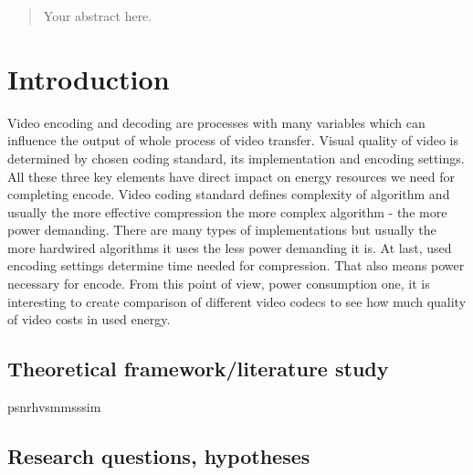 \documentclass[12pt,twoside]{article}
\begin{document}
\maketitle


\begin{abstract}
\label{sec:abstract}

Your abstract here.

\end{abstract}


\tableofcontents
{}
\printglossary[type=\acronymtype]



\clearpage
\section{Introduction}
\label{sect:introduction}
Video encoding and decoding are processes with many variables which can influence the output of whole process of video transfer. Visual quality of video is determined by chosen coding standard, its implementation and encoding settings. All these three key elements have direct impact on energy resources we need for completing encode. Video coding standard defines complexity of algorithm and usually the more effective compression the more complex algorithm - the more power demanding. There are many types of implementations but usually the more hardwired algorithms it uses the less power demanding it is. At last, used encoding settings determine time needed for compression. That also means power necessary for encode. From this point of view, power consumption one, it is interesting to create comparison of different video codecs to see how much quality of video costs in used energy.


\subsection{Theoretical framework/literature study}
\label{sect:framework}
\acrshort{psnrhvsm}\acrshort{msssim}


\subsection{Research questions, hypotheses}
\label{sect:questions}
\end{document}
